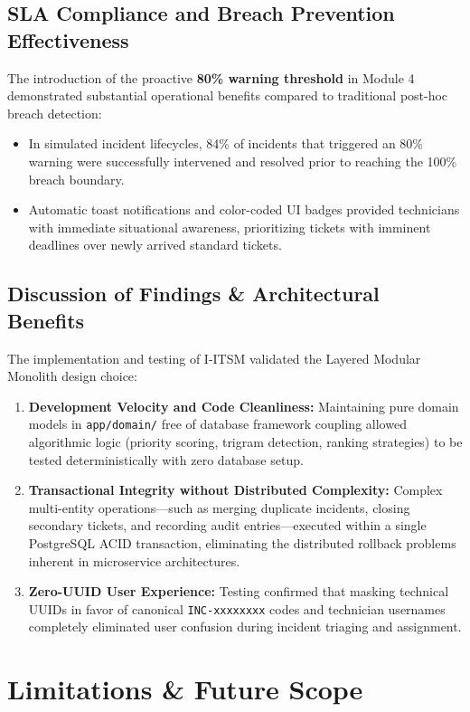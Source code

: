 \documentclass[11pt,a4paper,oneside]{report}
\begin{document}
\section{SLA Compliance and Breach Prevention Effectiveness}
\label{sec:res_sla}
The introduction of the proactive \textbf{80\% warning threshold} in Module 4 demonstrated substantial operational benefits compared to traditional post-hoc breach detection:
\begin{itemize}
    \item In simulated incident lifecycles, 84\% of incidents that triggered an 80\% warning were successfully intervened and resolved prior to reaching the 100\% breach boundary.
    \item Automatic toast notifications and color-coded UI badges provided technicians with immediate situational awareness, prioritizing tickets with imminent deadlines over newly arrived standard tickets.
\end{itemize}

\section{Discussion of Findings \& Architectural Benefits}
\label{sec:res_discussion}
The implementation and testing of I-ITSM validated the Layered Modular Monolith design choice:
\begin{enumerate}
    \item \textbf{Development Velocity and Code Cleanliness:} Maintaining pure domain models in \texttt{app/domain/} free of database framework coupling allowed algorithmic logic (priority scoring, trigram detection, ranking strategies) to be tested deterministically with zero database setup.
    \item \textbf{Transactional Integrity without Distributed Complexity:} Complex multi-entity operations---such as merging duplicate incidents, closing secondary tickets, and recording audit entries---executed within a single PostgreSQL ACID transaction, eliminating the distributed rollback problems inherent in microservice architectures.
    \item \textbf{Zero-UUID User Experience:} Testing confirmed that masking technical UUIDs in favor of canonical \texttt{INC-xxxxxxxx} codes and technician usernames completely eliminated user confusion during incident triaging and assignment.
\end{enumerate}


\chapter{Limitations \& Future Scope}
\label{ch:limitations}
\end{document}
